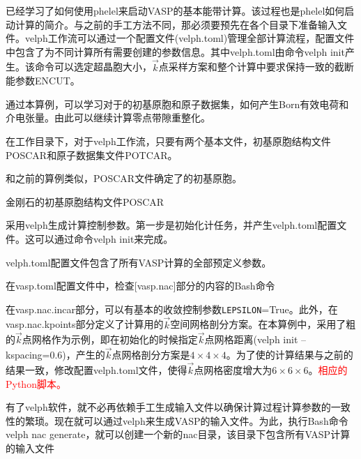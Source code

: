 {已经学习了如何使用\textrm{phelel}来启动\textrm{VASP}的基本能带计算。该过程也是\textrm{phelel}如何启动计算的简介。与之前的手工方法不同，那必须要预先在各个目录下准备输入文件。\textrm{velph}工作流可以通过一个配置文件\textrm{(velph.toml)}管理全部计算流程，配置文件中包含了为不同计算所有需要创建的参数信息。其中\textrm{velph.toml}由命令\textrm{velph init}产生。该命令可以选定超晶胞大小，$\vec k$点采样方案和整个计算中要求保持一致的截断能参数\textrm{ENCUT}。

通过本算例，可以学习对于的初基原胞和原子数据集，如何产生\textrm{Born}有效电荷和介电张量。由此可以继续计算零点带隙重整化。%

在工作目录下，对于\textrm{velph}工作流，只要有两个基本文件，初基原胞结构文件\textrm{POSCAR}和原子数据集文件\textrm{POTCAR}。

和之前的算例类似，\textrm{POSCAR}文件确定了的初基原胞。

金刚石的初基原胞结构文件\textrm{POSCAR}


采用\textrm{velph}生成计算控制参数。第一步是初始化计任务，并产生\textrm{velph.toml}配置文件。这可以通过命令\textrm{velph init}来完成。%


\textrm{velph.toml}配置文件包含了所有\textrm{VASP}计算的全部预定义参数。

在\textrm{vasp.toml}配置文件中，检查\textrm{[vasp.nac]}部分的内容的\textrm{Bash}命令

在\textrm{vasp.nac.incar}部分，可以有基本的收敛控制参数\texttt{LEPSILON}=\textrm{True}。此外，在\textrm{vasp.nac.kpoints}部分定义了计算用的$\vec k$空间网格剖分方案。在本算例中，采用了粗的$\vec k$点网格作为示例，即在初始化的时候指定$\vec k$点网格距离\textrm{(velph init --kspacing=0.6)}，产生的$\vec k$点网格剖分方案是$4\times4\times4$。为了使的计算结果与之前的结果一致，修改配置\textrm{velph.toml}文件，使得$\vec k$点网格密度增大为$6\times6\times6$。\textcolor{red}{相应的\textrm{Python}脚本。}

有了\textrm{velph}软件，就不必再依赖手工生成输入文件以确保计算过程计算参数的一致性的繁琐。现在就可以通过\textrm{velph}来生成\textrm{VASP}的输入文件。为此，执行\textrm{Bash}命令\textrm{velph nac generate}，就可以创建一个新的\textrm{nac}目录，该目录下包含所有\textrm{VASP}计算的输入文件

}
